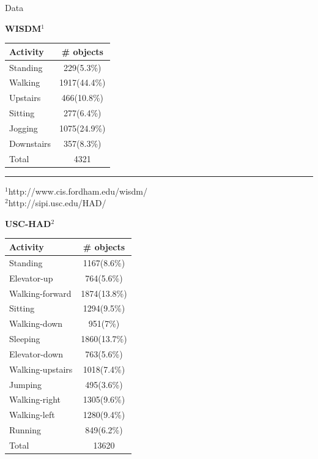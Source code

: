 \documentclass{beamer}
\begin{document}
\begin{frame}{Data}
\noindent
\begin{minipage}[t]{0.45\linewidth}
	\textbf{WISDM}$^1$
	\begin{table}[]
		\small
		\label{my-label}
		\begin{tabular}{|l|c|}
			\hline
			Activity   & \# objects \\
			\hline
			Standing   & 229(5.3\%)  \\
			Walking    & 1917(44.4\%) \\
			Upstairs   & 466(10.8\%) \\
			Sitting    & 277(6.4\%)  \\
			Jogging    & 1075(24.9\%) \\
			Downstairs & 357(8.3\%) \\
			\hline
			Total & 4321  \\
			\hline
		\end{tabular}
	\end{table}

	\vspace{1cm}
	\medskip\hrule\medskip
	{\footnotesize $^1$http://www.cis.fordham.edu/wisdm/ \\
		$^2$http://sipi.usc.edu/HAD/}
	
\end{minipage}
\hfill
\begin{minipage}[t]{0.48\linewidth}
	\textbf{USC-HAD}$^2$
	\begin{table}[]
		\small
		\label{my-label}
		\begin{tabular}{|l|c|}
			\hline
			Activity & \# objects \\ \hline
			Standing           & 1167(8.6\%)  \\
			Elevator-up        & 764(5.6\%)  \\
			Walking-forward    & 1874(13.8\%) \\
			Sitting            & 1294(9.5\%)  \\
			Walking-down & 951(7\%)  \\
			Sleeping           & 1860(13.7\%) \\
			Elevator-down        & 763(5.6\%)  \\
			Walking-upstairs        & 1018(7.4\%)  \\
			Jumping        & 495(3.6\%)  \\
			Walking-right        & 1305(9.6\%)  \\
			Walking-left        & 1280(9.4\%)  \\
			Running            & 849(6.2\%)  \\ \hline 
			Total              & 13620                                \\ \hline
		\end{tabular}
	\end{table}
\end{minipage}

\end{frame}
\end{document}
